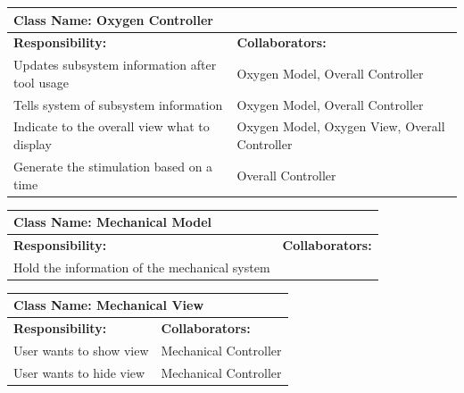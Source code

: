 \documentclass[12pt, titlepage]{article}
\begin{document}
\begin{enumerate}[a)]
	\begin{table}[H]
		\centering
		\begin{tabular}{|p{5cm}|p{5cm}|}
		\hline 
		 \multicolumn{2}{|l|}{\textbf{Class Name: Oxygen Controller}} \\
		\hline
		\textbf{Responsibility:} & \textbf{Collaborators:} \\
		\hline
		Updates subsystem information after tool usage & Oxygen Model, Overall Controller\\
		\hline
		 Tells system of subsystem information & Oxygen Model, Overall Controller\\
		\hline
		 Indicate to the overall view what to display & Oxygen Model, Oxygen View, Overall Controller\\
		\hline
		 Generate the stimulation based on a time & Overall Controller \\
		\hline
		\end{tabular}
	\end{table}

	\begin{table}[H]
		\centering
		\begin{tabular}{|p{5cm}|p{5cm}|}
		\hline 
		 \multicolumn{2}{|l|}{\textbf{Class Name: Mechanical Model}} \\
		\hline
		\textbf{Responsibility:} & \textbf{Collaborators:} \\
		\hline
		 Hold the information of the mechanical system & \\
		\hline
		\end{tabular}
	\end{table}

	\begin{table}[H]
		\centering
		\begin{tabular}{|p{5cm}|p{5cm}|}
		\hline 
		 \multicolumn{2}{|l|}{\textbf{Class Name: Mechanical View}} \\
		\hline
		\textbf{Responsibility:} & \textbf{Collaborators:} \\
		\hline
		 User wants to show view & Mechanical Controller\\
		\hline
		User wants to hide view & Mechanical Controller\\
		\hline
		\end{tabular}
	\end{table}


\end{enumerate}
\end{document}
